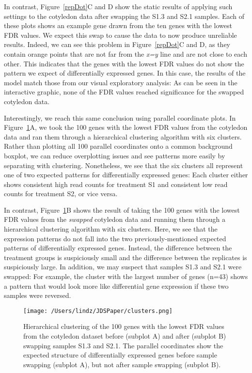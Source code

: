 \documentclass{bioinfo}
\begin{document}
In contrast, Figure~\ref{repDot}C and D show the static results of applying such settings to the cotyledon data after swapping the S1.3 and S2.1 samples. Each of these plots shows an example gene drawn from the ten genes with the lowest FDR values. We expect this swap to cause the data to now produce unreliable results. Indeed, we can see this problem in Figure~\ref{repDot}C and D, as they contain orange points that are not far from the \textit{x=y} line and are not close to each other. This indicates that the genes with the lowest FDR values do not show the pattern we expect of differentially expressed genes. In this case, the results of the model match those from our visual exploratory analysis: As can be seen in the interactive graphic, none of the FDR values reached significance for the swapped cotyledon data.

Interestingly, we reach this same conclusion using parallel coordinate plots. In Figure~\ref{clusters}A, we took the 100 genes with the lowest FDR values from the cotyledon data and ran them through a hierarchical clustering algorithm with six clusters. Rather than plotting all 100 parallel coordinates onto a common background boxplot, we can reduce overplotting issues and see patterns more easily by separating with clustering. Nonetheless, we see that the six clusters all represent one of two expected patterns for differentially expressed genes: Each cluster either shows consistent high read counts for treatment S1 and consistent low read counts for treatment S2, or vice versa.

In contrast, Figure~\ref{clusters}B shows the result of taking the 100 genes with the lowest FDR values from the \textit{swapped} cotyledon data and running them through a hierarchical clustering algorithm with six clusters. Here, we see that the expression patterns do not fall into the two previously-mentioned expected patterns of differentially expressed genes. Instead, the difference between the treatment groups is suspiciously small and the difference between the replicates is suspiciously large. In addition, we may suspect that samples S1.3 and S2.1 were swapped: For example, the cluster with the largest number of genes (n=43) shows a pattern that would look more like differential gene expression if these two samples were reversed.

\begin{figure}[!tpb]
\centerline{\texttt{[image: /Users/lindz/JDSPaper/clusters.png]}}
\caption{Hierarchical clustering of the 100 genes with the lowest FDR values from the cotyledon dataset before (subplot A) and after (subplot B) swapping samples S1.3 and S2.1. The parallel coordinates show the expected structure of differentially expressed genes before sample swapping (subplot A), but not after sample swapping (subplot B).
\label{clusters}}
\end{figure}
\end{document}
